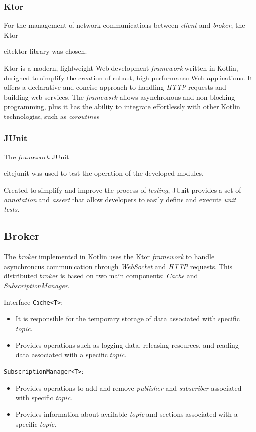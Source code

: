 \subsubsection{Ktor}
For the management of network communications between \textit{client} and \textit{broker}, the Ktor{cite{ktor}
library was chosen.

Ktor is a modern, lightweight Web development \textit{framework} written in Kotlin, designed to simplify the creation of
robust, high-performance Web applications. It offers a declarative and concise approach to handling \textit{HTTP}
requests and building web services. The \textit{framework} allows asynchronous and non-blocking programming, plus it has
the ability to integrate effortlessly with other Kotlin technologies, such as \textit{coroutines}

\subsubsection{JUnit}
The \textit{framework} JUnit{cite{junit} was used to test the operation of the developed modules.

Created to simplify and improve the process of \textit{testing}, JUnit provides a set of \textit{annotation} and
\textit{assert} that allow developers to easily define and execute \textit{unit tests}.

\subsection{Broker}
The \textit{broker} implemented in Kotlin uses the Ktor \textit{framework} to handle asynchronous communication through \textit{WebSocket} and \textit{HTTP} requests. This distributed \textit{broker} is based on two main components: \textit{Cache} and \textit{SubscriptionManager}.

Interface \texttt{Cache<T>}:

\begin{itemize}
    \item It is responsible for the temporary storage of data associated with specific \textit{topic}.
    \item Provides operations such as logging data, releasing resources, and reading data associated with a specific \textit{topic}.
\end{itemize}

\texttt{SubscriptionManager<T>}:

\begin{itemize}
    \item Provides operations to add and remove \textit{publisher} and \textit{subscriber} associated with specific \textit{topic}.
    \item Provides information about available \textit{topic} and sections associated with a specific \textit{topic}.
\end{itemize}

}}
